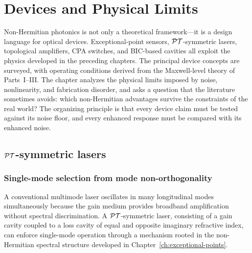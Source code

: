 \chapter{Devices and Physical Limits}
\label{ch:devices}

\begin{chapterlead}
Non-Hermitian photonics is not only a theoretical framework---it is a
design language for optical devices. Exceptional-point sensors,
$\mathcal{PT}$-symmetric lasers, topological amplifiers, CPA switches, and
BIC-based cavities all exploit the physics developed in the preceding
chapters. The principal device concepts are surveyed, with operating
conditions derived from the Maxwell-level theory of Parts~I--III. The
chapter analyzes the physical limits imposed by noise, nonlinearity, and
fabrication disorder, and asks a question that the literature sometimes
avoids: which non-Hermitian advantages survive the constraints of
the real world? The organizing principle is that every device claim
must be tested against its noise floor, and every enhanced response must
be compared with its enhanced noise.
\end{chapterlead}


\section{$\mathcal{PT}$-symmetric lasers}
\label{sec:pt-lasers}

\subsection{Single-mode selection from mode non-orthogonality}
\label{ssec:pt-single-mode}

A conventional multimode laser oscillates in many longitudinal modes
simultaneously because the gain medium provides broadband amplification
without spectral discrimination. A $\mathcal{PT}$-symmetric laser, consisting of
a gain cavity coupled to a loss cavity of equal and opposite imaginary
refractive index, can enforce single-mode operation through a mechanism
rooted in the non-Hermitian spectral structure developed in
Chapter~\ref{ch:exceptional-points}.

